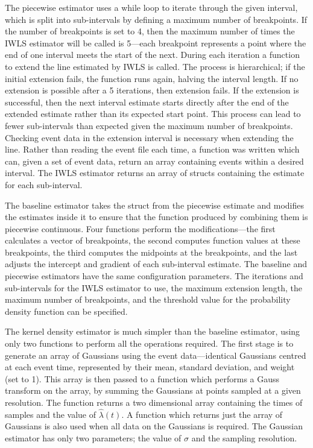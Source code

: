\documentclass[a4paper,11pt,twoside]{article}
\begin{document}
   The piecewise estimator uses a while loop to iterate through the given
   interval, which is split into sub-intervals by defining a maximum number of
   breakpoints. If the number of breakpoints is set to 4, then the maximum
   number of times the IWLS estimator will be called is 5---each breakpoint
   represents a point where the end of one interval meets the start of the
   next. During each iteration a function to extend the line estimated by IWLS
   is called. The process is hierarchical; if the initial extension fails, the
   function runs again, halving the interval length. If no extension is possible
   after a 5 iterations, then extension fails. If the extension is successful,
   then the next interval estimate starts directly after the end of the extended
   estimate rather than its expected start point. This process can lead to fewer
   sub-intervals than expected given the maximum number of breakpoints. Checking
   event data in the extension interval is necessary when extending the
   line. Rather than reading the event file each time, a function was written
   which can, given a set of event data, return an array containing events
   within a desired interval. The IWLS estimator returns an array of structs
   containing the estimate for each sub-interval.

   The baseline estimator takes the struct from the piecewise estimate and
   modifies the estimates inside it to ensure that the function produced by
   combining them is piecewise continuous. Four functions perform the
   modifications---the first calculates a vector of breakpoints, the second
   computes function values at these breakpoints, the third computes the
   midpoints at the breakpoints, and the last adjusts the intercept and gradient
   of each sub-interval estimate. The baseline and piecewise estimators have the
   same configuration parameters. The iterations and sub-intervals for the IWLS
   estimator to use, the maximum extension length, the maximum number of
   breakpoints, and the threshold value for the probability density function can
   be specified.

   The kernel density estimator is much simpler than the baseline estimator,
   using only two functions to perform all the operations required. The first
   stage is to generate an array of Gaussians using the event data---identical
   Gaussians centred at each event time, represented by their mean, standard
   deviation, and weight (set to 1). This array is then passed to a function
   which performs a Gauss transform on the array, by summing the Gaussians at
   points sampled at a given resolution. The function returns a two dimensional
   array containing the times of samples and the value of $\hat{\lambda}(t)$. A
   function which returns just the array of Gaussians is also used when all data
   on the Gaussians is required. The Gaussian estimator has only two parameters;
   the value of $\sigma$ and the sampling resolution.
\end{document}
